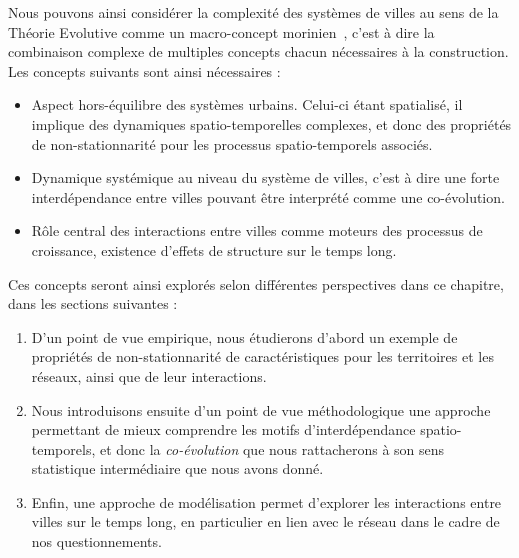 Nous pouvons ainsi considérer la complexité des systèmes de villes au sens de la Théorie Evolutive comme un macro-concept morinien~\cite{morin1976methode}, c'est à dire la combinaison complexe de multiples concepts chacun nécessaires à la construction. Les concepts suivants sont ainsi nécessaires :
\begin{itemize}
	\item Aspect hors-équilibre des systèmes urbains. Celui-ci étant spatialisé, il implique des dynamiques spatio-temporelles complexes, et donc des propriétés de non-stationnarité pour les processus spatio-temporels associés. %
	\item Dynamique systémique au niveau du système de villes, c'est à dire une forte interdépendance entre villes pouvant être interprété comme une co-évolution.
	\item Rôle central des interactions entre villes comme moteurs des processus de croissance, existence d'effets de structure sur le temps long.
\end{itemize}


Ces concepts seront ainsi explorés selon différentes perspectives dans ce chapitre, dans les sections suivantes :
\begin{enumerate}
	\item D'un point de vue empirique, nous étudierons d'abord un exemple de propriétés de non-stationnarité de caractéristiques pour les territoires et les réseaux, ainsi que de leur interactions.
	\item Nous introduisons ensuite d'un point de vue méthodologique une approche permettant de mieux comprendre les motifs d'interdépendance spatio-temporels, et donc la \emph{co-évolution} que nous rattacherons à son sens statistique intermédiaire que nous avons donné.
	\item Enfin, une approche de modélisation permet d'explorer les interactions entre villes sur le temps long, en particulier en lien avec le réseau dans le cadre de nos questionnements.
\end{enumerate}




\stars






